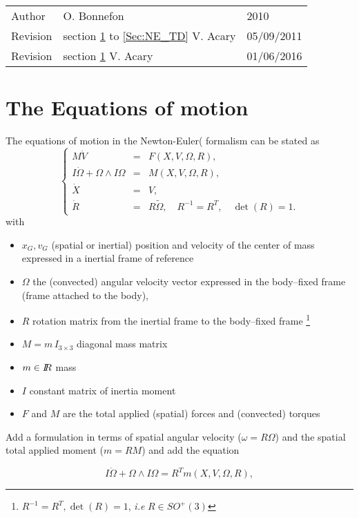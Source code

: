 


\begin{tabular}{lll}
  \centering
  Author &  O. Bonnefon &2010\\
  Revision& section \ref{Sec:NE_motion} to \ref{Sec:NE_TD} V. Acary&  05/09/2011\\
  Revision& section \ref{Sec:NE_motion}  V. Acary&  01/06/2016\\

\end{tabular}
\section{The Equations of motion}
\label{Sec:NE_motion}
The equations of motion in the Newton-Euler(\cite{Wittenburg1977,Haug89} formalism can be stated as
\begin{equation}
  \label{eq:NewtonEuler}
  \left\{\begin{array}{rcl}
    M \dot V &=& F(X, V, \Omega, R), \\
    I \dot \Omega + \Omega \wedge I\Omega &=&  M(X,V, \Omega, R), \\
    \dot X &=& V, \\
    \dot R &=& R \tilde \Omega,\quad R^{-1}=R^T,\quad  \det(R)=1 .
\end{array}\right.
\end{equation}
with
\begin{itemize}
\item $x_G,v_G$ (spatial or inertial) position and velocity of the center of mass expressed in a inertial frame of reference
\item $\Omega$  the (convected) angular velocity vector expressed in the body--fixed frame (frame attached to the body), 
\item $R$ rotation matrix from the inertial frame to the body--fixed frame \footnote{$R^{-1}=R^T, \det(R)=1$, \textit{i.e} $ R\in SO^+(3)$}
\item $M=m\,I_{3\times 3}$ diagonal mass matrix
\item $m \in \mbox{\rm $I\!\!R$}$ mass
\item $I$ constant matrix of inertia moment 
\item $F$ and $ M$ are the total applied (spatial) forces and  (convected) torques
\end{itemize}

\begin{ndrva}
  Add a formulation in terms of spatial angular velocity ($\omega = R
  \Omega$) and the spatial total applied moment ($m = R M$) and add
  the equation

$$ I \dot \Omega + \Omega \wedge I\Omega =  R^T m(X,V, \Omega, R), $$


\end{ndrva}
